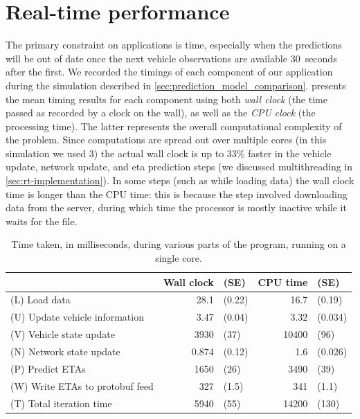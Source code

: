 \section{Real-time performance}
\label{sec:prediction_performance}

The primary constraint on \rt{} applications is time, especially when the predictions will be out of date once the next vehicle observations are available 30~seconds after the first. We recorded the timings of each component of our application during the simulation described in \cref{sec:prediction_model_comparison}.  presents the mean timing results for each component using both \emph{wall clock} (the time passed as recorded by a clock on the wall), as well as the \emph{CPU clock} (the processing time). The latter represents the overall computational complexity of the problem. Since computations are spread out over multiple cores (in this simulation we used 3)  the actual wall clock is up to 33\% faster in the vehicle update, network update, and \gls{eta} prediction steps (we discussed multithreading in \cref{sec:rt-implementation}). In some steps (such as while loading data) the wall clock time is longer than the CPU time: this is because the step involved downloading data from the server, during which time the processor is mostly inactive while it waits for the file.



\begin{knitrout}\small
{}\color{fgcolor}\begin{table}

\caption{\label{tab:prediction_timing}Time taken, in milliseconds, during various parts of the program, running on a single core.}
\centering
\fontsize{8}{10}\selectfont
\begin{tabular}[t]{lrlrl}
\toprule
 & Wall clock & (SE) & CPU time & (SE)\\
\midrule
(L) Load data & 28.1 & (0.22) & 16.7 & (0.19)\\
(U) Update vehicle information & 3.47 & (0.04) & 3.32 & (0.034)\\
(V) Vehicle state update & 3930 & (37) & 10400 & (96)\\
(N) Network state update & 0.874 & (0.12) & 1.6 & (0.026)\\
(P) Predict ETAs & 1650 & (26) & 3490 & (39)\\
\addlinespace
(W) Write ETAs to protobuf feed & 327 & (1.5) & 341 & (1.1)\\
\midrule
(T) Total iteration time & 5940 & (55) & 14200 & (130)\\
\bottomrule
\end{tabular}
\end{table}


\end{knitrout}


